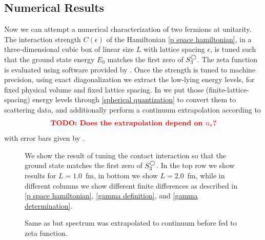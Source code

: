 \subsection{Numerical Results}

Now we can attempt a numerical characterization of {\color{red} two} fermions at unitarity.
The interaction strength $C(\epsilon)$ of the Hamiltonian \eqref{p space hamiltonian}, in a three-dimensional cubic box of linear size $L$ with lattice spacing $\epsilon$, is tuned such that the ground state energy $E_0$ matches the first zero of $S^{\bigcirc}_3$.
The zeta function is evaluated using software provided by .
Once the strength is tuned to machine precision, using exact diagonalization we extract the low-lying energy levels, for fixed physical volume and fixed lattice spacing.
In  we put those (finite-lattice-spacing) energy levels through \eqref{spherical quantization} to convert them to scattering data, and additionally perform a continuum extrapolation according to
\begin{equation}
    \text{{\bf\color{red}TODO: Does the extrapolation depend on \ensuremath{{n_s}}?}}
\end{equation}
with error bars given by .  

\begin{figure}[th]
    
    \caption{We show the result of tuning the contact interaction so that the ground state matches the first zero of $S^{\bigcirc}_3$.  In the top row we show results for $L=1.0$~fm, in bottom we show $L=2.0$~fm, while in different columns we show different finite differences as described in \eqref{p space hamiltonian}, \eqref{gamma definition}, and \eqref{gamma determination}. }
    \label{fig:unimproved spherical}
\end{figure}

\begin{figure}[th]
    
    \caption{Same as  but spectrum was extrapolated to continuum before fed to zeta function.}
    \label{fig:unimproved spherical continuum extrapolation}
\end{figure}


